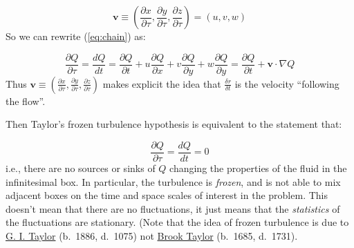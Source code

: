 \documentclass[12pt]{article}
\begin{document}
\begin{equation}
  \label{eq:velocity}
  \mathbf{v} \equiv 
\left ( \frac{\partial x}{\partial \tau} , \frac{\partial y}{\partial \tau}, 
   \frac{\partial z}{\partial \tau} \right ) =
\left ( u, v, w \right )
\end{equation}
So we can rewrite (\ref{eq:chain}) as:

\begin{equation}
  \label{eq:chain2}
  \frac{\partial Q}{\partial \tau} = \frac{d Q}{dt} = 
\frac{\partial Q}{\partial t} +
u \frac{\partial Q}{\partial x}  + 
v \frac{\partial Q}{\partial y} +
w \frac{\partial Q}{\partial y} =
\frac{\partial Q}{\partial t} +
\mathbf{v} \cdot \nabla Q
\end{equation}
Thus   $\mathbf{v} \equiv 
   \left ( \frac{\partial x}{\partial \tau} , \frac{\partial y}{\partial \tau}, 
   \frac{\partial z}{\partial \tau} \right )$
makes explicit the idea that $\frac{\delta r }{\delta t}$ is the velocity
``following the flow''.


Then Taylor's frozen turbulence hypothesis is equivalent to the statement that:

\begin{equation}
  \label{eq:taylor}
\frac{\partial Q}{\partial \tau} =  \frac{d Q}{dt} = 0
\end{equation}
i.e., there are no sources or sinks of $Q$ changing the properties of the
fluid in the infinitesimal box.    In particular, the turbulence is
\textit{frozen}, and is not able to mix adjacent boxes on the time and
space scales of interest in the problem.  This doesn't mean that
there are no fluctuations, it just means that the \textit{statistics} of 
the fluctuations are stationary.  (Note that
the idea of frozen turbulence is due to 
\href{http://en.wikipedia.org/wiki/Geoffrey_Ingram_Taylor}{G. I. Taylor} (b.~1886, d.~1075)
not \href{http://en.wikipedia.org/wiki/Brook_Taylor}{Brook Taylor} (b.~1685, d.~1731). 
\end{document}
